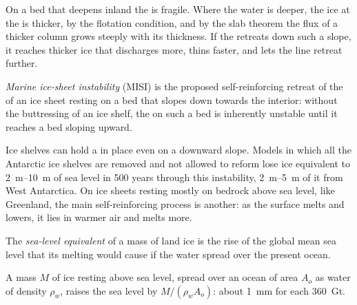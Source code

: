 On a bed that deepens inland the  is fragile. Where the
water is deeper, the ice at the  is thicker, by the flotation
condition, and by the slab theorem the flux of a thicker column grows
steeply with its thickness. If the  retreats down such a
slope, it reaches thicker ice that discharges more, thins faster, and lets
the line retreat further.

\begin{definition}\label{def:b3:glaciology:misi}
\emph{Marine ice-sheet instability}
(MISI) is the proposed self-reinforcing retreat of the  of an
ice sheet resting on a bed that slopes down towards the interior: without
the buttressing of an ice shelf, the  on such a bed is
inherently unstable until it reaches a bed sloping upward.
\end{definition}

Ice shelves can hold a  in place even on a downward slope.
Models in which all the Antarctic ice shelves are removed and not allowed
to reform lose ice equivalent to \qtyrange{2}{10}{m} of sea level in 500
years through this instability, \qtyrange{2}{5}{m} of it from West
Antarctica. On ice sheets resting mostly on bedrock above sea level, like
Greenland, the main self-reinforcing process is another: as the surface
melts and lowers, it lies in warmer air and melts more.

\begin{definition}\label{def:b3:glaciology:sle}
The \emph{sea-level equivalent} of a mass of
land ice is the rise of the global mean sea level that its melting would
cause if the water spread over the present ocean.
\end{definition}

\begin{proposition}\label{prop:b3:glaciology:sle}
A mass $M$ of ice resting above sea level, spread over an ocean of area
$A_o$ as water of density $\rho_w$, raises the sea level by $M/(\rho_wA_o)$:
about \qty{1}{mm} for each \qty{360}{Gt}.
\end{proposition}

